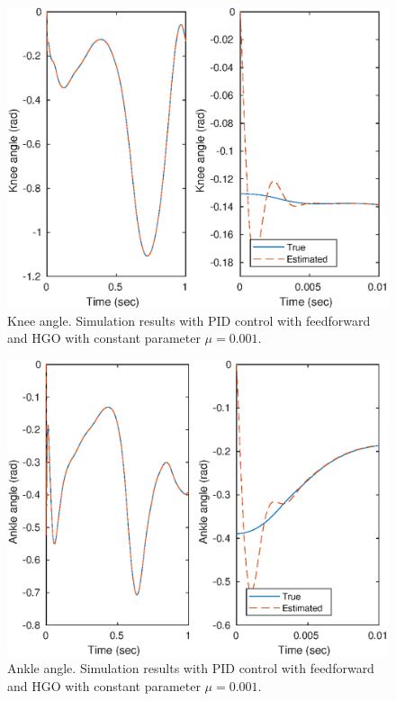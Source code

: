 \documentclass[letterpaper, 10 pt, conference]{ieeeconf}  %
\theoremstyle{plain}
\theoremstyle{definition}
\theoremstyle{remark}
\begin{document}
%
%
\begin{figure}[h!]
\begin{center}
\includegraphics[width = 13cm]{Figs/q_knee_mu_1e-03.eps}
\caption{Knee angle. Simulation results with PID control with feedforward and HGO with constant parameter $\mu=0.001$.}
\label{fig:knee}
\end{center}
\end{figure}
%
\begin{figure}[h!]
	\begin{center}
	\includegraphics[width = 13cm]{Figs/q_ankle_mu_1e-03.eps}
	\caption{Ankle angle. Simulation results with PID control with feedforward and HGO with constant parameter $\mu=0.001$.}
	\label{fig:ankle}
	\end{center}
	\end{figure}
\end{document}
